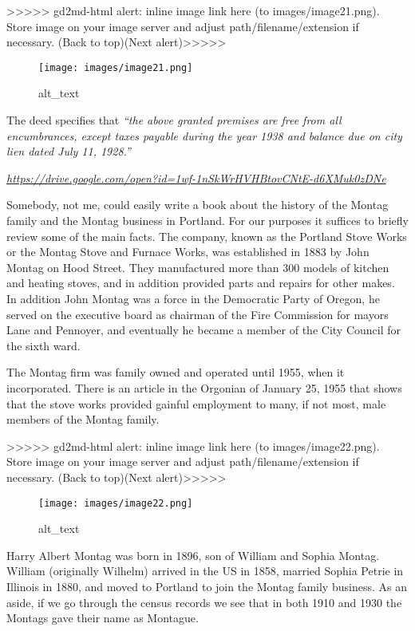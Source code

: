 \documentclass[
]{article}
\begin{document}
{\textgreater\textgreater\textgreater\textgreater\textgreater{}
gd2md-html alert: inline image link here (to images/image21.png). Store
image on your image server and adjust path/filename/extension if
necessary. }(Back to top)(Next
alert){\textgreater\textgreater\textgreater\textgreater\textgreater{} }

\begin{figure}
\centering
\texttt{[image: images/image21.png]}
\caption{alt\_text}
\end{figure}

The deed specifies that \emph{``the above granted premises are free from
all encumbrances, except taxes payable during the year 1938 and balance
due on city lien dated July 11, 1928.''}

\emph{\url{https://drive.google.com/open?id=1wf-1nSkWrHVHBtovCNtE-d6XMuk0zDNe}}

Somebody, not me, could easily write a book about the history of the
Montag family and the Montag business in Portland. For our purposes it
suffices to briefly review some of the main facts. The company, known as
the Portland Stove Works or the Montag Stove and Furnace Works, was
established in 1883 by John Montag on Hood Street. They manufactured
more than 300 models of kitchen and heating stoves, and in addition
provided parts and repairs for other makes. In addition John Montag was
a force in the Democratic Party of Oregon, he served on the executive
board as chairman of the Fire Commission for mayors Lane and Pennoyer,
and eventually he became a member of the City Council for the sixth
ward.

The Montag firm was family owned and operated until 1955, when it
incorporated. There is an article in the Orgonian of January 25, 1955
that shows that the stove works provided gainful employment to many, if
not most, male members of the Montag family.

{\textgreater\textgreater\textgreater\textgreater\textgreater{}
gd2md-html alert: inline image link here (to images/image22.png). Store
image on your image server and adjust path/filename/extension if
necessary. }(Back to top)(Next
alert){\textgreater\textgreater\textgreater\textgreater\textgreater{} }

\begin{figure}
\centering
\texttt{[image: images/image22.png]}
\caption{alt\_text}
\end{figure}

Harry Albert Montag was born in 1896, son of William and Sophia Montag.
William (originally Wilhelm) arrived in the US in 1858, married Sophia
Petrie in Illinois in 1880, and moved to Portland to join the Montag
family business. As an aside, if we go through the census records we see
that in both 1910 and 1930 the Montags gave their name as Montague.
\end{document}
